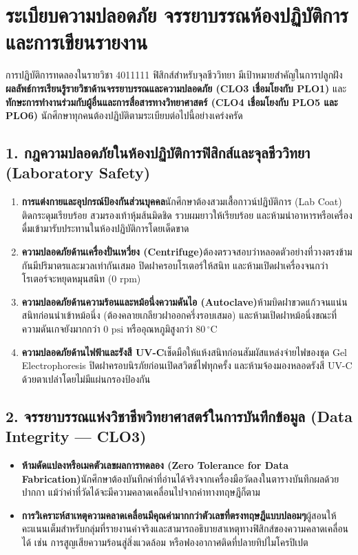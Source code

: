 \chapter*{ระเบียบความปลอดภัย จรรยาบรรณห้องปฏิบัติการ และการเขียนรายงาน}

การปฏิบัติการทดลองในรายวิชา 4011111 ฟิสิกส์สำหรับจุลชีววิทยา มีเป้าหมายสำคัญในการปลูกฝัง \textbf{ผลลัพธ์การเรียนรู้รายวิชาด้านจรรยาบรรณและความปลอดภัย (CLO3 เชื่อมโยงกับ PLO1)} และ \textbf{ทักษะการทำงานร่วมกับผู้อื่นและการสื่อสารทางวิทยาศาสตร์ (CLO4 เชื่อมโยงกับ PLO5 และ PLO6)} นักศึกษาทุกคนต้องปฏิบัติตามระเบียบต่อไปนี้อย่างเคร่งครัด

\section*{1. กฎความปลอดภัยในห้องปฏิบัติการฟิสิกส์และจุลชีววิทยา (Laboratory Safety)}
\begin{enumerate}
    \item \textbf{การแต่งกายและอุปกรณ์ป้องกันส่วนบุคคล}\quad นักศึกษาต้องสวมเสื้อกาวน์ปฏิบัติการ (Lab Coat) ติดกระดุมเรียบร้อย สวมรองเท้าหุ้มส้นมิดชิด รวบผมยาวให้เรียบร้อย และห้ามนำอาหารหรือเครื่องดื่มเข้ามารับประทานในห้องปฏิบัติการโดยเด็ดขาด
    \item \textbf{ความปลอดภัยด้านเครื่องปั่นเหวี่ยง (Centrifuge)}\quad ต้องตรวจสอบว่าหลอดตัวอย่างที่วางตรงข้ามกันมีปริมาตรและมวลเท่ากันเสมอ ปิดฝาครอบโรเตอร์ให้สนิท และห้ามเปิดฝาเครื่องจนกว่าโรเตอร์จะหยุดหมุนสนิท ($0\text{ rpm}$)
    \item \textbf{ความปลอดภัยด้านความร้อนและหม้อนึ่งความดันไอ (Autoclave)}\quad ห้ามบิดฝาขวดแก้วจนแน่นสนิทก่อนนำเข้าหม้อนึ่ง (ต้องคลายเกลียวฝาออกครึ่งรอบเสมอ) และห้ามเปิดฝาหม้อนึ่งขณะที่ความดันเกจยังมากกว่า $0\text{ psi}$ หรืออุณหภูมิสูงกว่า $80\,^\circ\text{C}$
    \item \textbf{ความปลอดภัยด้านไฟฟ้าและรังสี UV-C}\quad เช็ดมือให้แห้งสนิทก่อนสัมผัสแหล่งจ่ายไฟของชุด Gel Electrophoresis ปิดฝาครอบนิรภัยก่อนเปิดสวิตช์ไฟทุกครั้ง และห้ามจ้องมองหลอดรังสี UV-C ด้วยตาเปล่าโดยไม่มีแผ่นกรองป้องกัน
\end{enumerate}

\section*{2. จรรยาบรรณแห่งวิชาชีพวิทยาศาสตร์ในการบันทึกข้อมูล (Data Integrity — CLO3)}
\begin{itemize}
    \item \textbf{ห้ามดัดแปลงหรือเมคตัวเลขผลการทดลอง (Zero Tolerance for Data Fabrication)}\quad นักศึกษาต้องบันทึกค่าที่อ่านได้จริงจากเครื่องมือวัดลงในตารางบันทึกผลด้วยปากกา แม้ว่าค่าที่วัดได้จะมีความคลาดเคลื่อนไปจากค่าทางทฤษฎีก็ตาม
    \item \textbf{การวิเคราะห์สาเหตุความคลาดเคลื่อนมีคุณค่ามากกว่าตัวเลขที่ตรงทฤษฎีแบบปลอมๆ}\quad ผู้สอนให้คะแนนเต็มสำหรับกลุ่มที่รายงานค่าจริงและสามารถอธิบายสาเหตุทางฟิสิกส์ของความคลาดเคลื่อนได้ เช่น การสูญเสียความร้อนสู่สิ่งแวดล้อม หรือฟองอากาศติดที่ปลายทิปไมโครปิเปต
\end{itemize}

